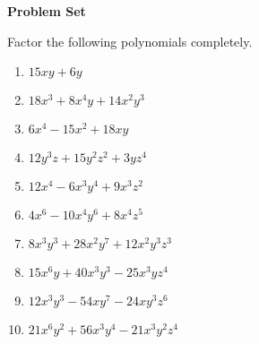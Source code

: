 \textbf{Problem Set}

\vspce

Factor the following polynomials completely.  
\begin{enumerate}
\item \hspce  $15xy + 6y$
\item \hspce $18x^{3} + 8x^{4}y + 14x^{2}y^{3}$
\item \hspce $6x^{4} - 15x^{2} + 18xy$
\item \hspce $12y^{3}z + 15y^{2}z^{2} + 3yz^{4}$
\item \hspce $12 x^{4} - 6 x^{3} y^{4} + 9 x^{3} z^{2}$
\item \hspce $4 x^{6} - 10 x^{4} y^{6} + 8 x^{4} z^{5}$

\item \hspce $8 x^{3} y^{3} + 28 x^{2} y^{7} + 12 x^{2} y^{3} z^{3}$

\item \hspce $15 x^{6} y + 40 x^{3} y^{3} - 25 x^{3} y z^{4}$

\item \hspce $12 x^{3} y^{3} - 54 x y^{7} - 24 x y^{3} z^{6}$

\item \hspce $21 x^{6} y^{2} + 56 x^{3} y^{4} - 21 x^{3} y^{2} z^{4}$
\end{enumerate}